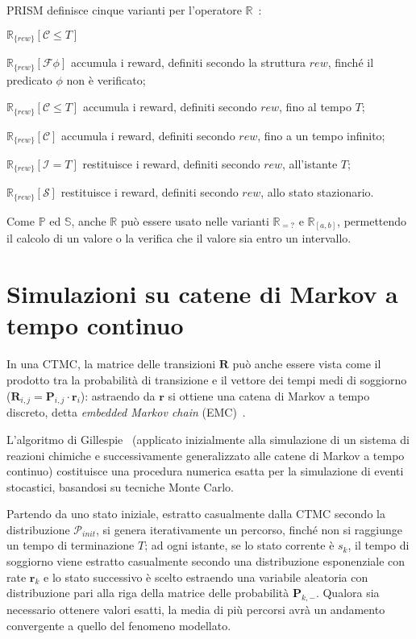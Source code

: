 		PRISM definisce cinque varianti per l'operatore $\mathbb{R}$~\cite{reward}:
		\begin{labeling}{$\mathbb{R}_{\{rew\}} {[\mathcal{C} \leq T]}$}
			\item [$\mathbb{R}_{\{rew\}} {[\mathcal{F} \phi]}$] accumula i reward, definiti secondo la struttura $rew$, finch\'e il predicato $\phi$ non \`e verificato;
			\item [$\mathbb{R}_{\{rew\}} {[\mathcal{C} \leq T]}$] accumula i reward, definiti secondo $rew$, fino al tempo $T$;
			\item [$\mathbb{R}_{\{rew\}} {[\mathcal{C}]}$] accumula i reward, definiti secondo $rew$, fino a un tempo infinito;
			\item [$\mathbb{R}_{\{rew\}} {[\mathcal{I} = T]}$] restituisce i reward, definiti secondo $rew$, all'istante $T$;
			\item [$\mathbb{R}_{\{rew\}} {[\mathcal{S}]}$] restituisce i reward, definiti secondo $rew$, allo stato stazionario.
		\end{labeling}
		Come $\mathbb{P}$ ed $\mathbb{S}$, anche $\mathbb{R}$ pu\`o essere usato nelle varianti $\mathbb{R}_{=?}$ e $\mathbb{R}_{[a, b]}$, permettendo il calcolo di un valore o la verifica che il valore sia entro un intervallo.
	
	\section{Simulazioni su catene di Markov a tempo continuo}\label{sez:simul}
	In una CTMC, la matrice delle transizioni $\mathbf{R}$ pu\`o anche essere vista come il prodotto tra la probabilit\`a di transizione e il vettore dei tempi medi di soggiorno ($\mathbf{R}_{i,j} = \mathbf{P}_{i,j} \cdot \mathbf{r}_{i}$): astraendo da $\mathbf{r}$ si ottiene una catena di Markov a tempo discreto, detta \emph{embedded Markov chain} (EMC)~\cite{simulationmarkov}.
	
	L'algoritmo di Gillespie~\cite{gillespie1977exact} (applicato inizialmente alla simulazione di un sistema di reazioni chimiche e successivamente generalizzato alle catene di Markov a tempo continuo) costituisce una procedura numerica esatta per la simulazione di eventi stocastici, basandosi su tecniche Monte Carlo.
	
	Partendo da uno stato iniziale, estratto casualmente dalla CTMC secondo la distribuzione $\mathcal{P}_{init}$, si genera iterativamente un percorso, finch\'e non si raggiunge un tempo di terminazione $T$; ad ogni istante, se lo stato corrente \`e $s_k$, il tempo di soggiorno viene estratto casualmente secondo una distribuzione esponenziale con rate $\mathbf{r}_k$ e lo stato successivo \`e scelto estraendo una variabile aleatoria con distribuzione pari alla riga della matrice delle probabilit\`a $\mathbf{P}_{k,-}$.
	Qualora sia necessario ottenere valori esatti, la media di pi\`u percorsi avr\`a un andamento convergente a quello del fenomeno modellato.
	

